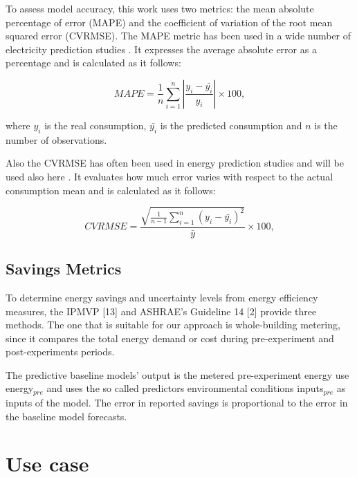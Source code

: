 \documentclass[10pt, conference, compsocconf]{IEEEtran}
\begin{document}
To assess model accuracy, this work uses two metrics: the mean absolute percentage of error (MAPE) and the coefficient of variation of the root mean squared error (CVRMSE).
The MAPE metric has been used in a wide number of electricity prediction studies \cite{fan2014development, edwards2012predicting}
. It expresses the average absolute error as a percentage and is calculated as it follows:

\[
 MAPE = \frac{1}{n}\sum_{i=1}^{n} |\frac{y_i-\bar{y_i}}{y_i}|\times 100,
\]

where $y_i$ is the real consumption, $\bar{y_i}$ is the predicted consumption and $n$ is the number of observations.

Also the CVRMSE has often been used in energy prediction studies \cite{quilumba2015using} and will be used also here %
. It evaluates how much error varies with respect
to the actual consumption mean and is calculated as it follows:

\[
 CVRMSE = \frac{\sqrt{\frac{1}{n-1}\sum_{i=1}^{n}(y_i-\bar{y_i})^2}}{\bar{y}} \times 100,
\]


\subsection{Savings Metrics}

To determine energy savings and uncertainty levels from energy efficiency measures, the IPMVP [13] and ASHRAE’s Guideline 14 [2] provide three methods. The one that is suitable for our approach is whole-building metering, since it compares the total energy demand or cost during pre-experiment and post-experiments periods.


The predictive baseline models' output is the metered pre-experiment energy use energy$_{pre}$ and uses the so called predictors environmental conditions inputs$_{pre}$ as inputs of the model. The error in reported savings is proportional to the error in the baseline model forecasts.


\section{Use case}
\end{document}

